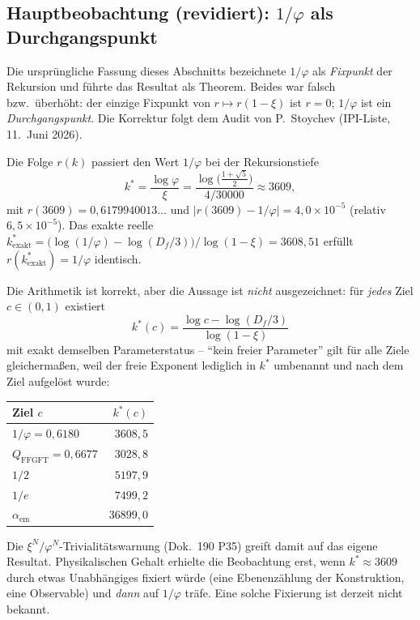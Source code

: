 \subsection{Hauptbeobachtung (revidiert): $1/\varphi$ als Durchgangspunkt}\label{sec:durchgang275}

\begin{remark}
Die ursprüngliche Fassung dieses Abschnitts bezeichnete $1/\varphi$ als
\emph{Fixpunkt} der Rekursion und führte das Resultat als Theorem. Beides
war falsch bzw.\ überhöht: der einzige Fixpunkt von $r\mapsto r(1-\xi)$
ist $r=0$; $1/\varphi$ ist ein \emph{Durchgangspunkt}. Die Korrektur
folgt dem Audit von P.~Stoychev (IPI-Liste, 11.~Juni 2026).
\end{remark}

\begin{beobachtung*}
Die Folge $r(k)$ passiert den Wert $1/\varphi$ bei der Rekursionstiefe
\begin{equation}
  k^* = \frac{\log\varphi}{\xi}
      = \frac{\log\!\bigl(\tfrac{1+\sqrt{5}}{2}\bigr)}{4/30000}
      \approx 3609,
  \label{eq:kstar275}
\end{equation}
mit $r(3609) = 0{,}6179940013\ldots$ und
$|r(3609)-1/\varphi| = 4{,}0\times10^{-5}$
(relativ $6{,}5\times10^{-5}$). Das exakte reelle
$k^*_\mathrm{exakt} = \bigl(\log(1/\varphi)-\log(D_f/3)\bigr)/\log(1-\xi)
= 3608{,}51$ erfüllt $r(k^*_\mathrm{exakt}) = 1/\varphi$ identisch.
\end{beobachtung*}

\begin{remark}
Die Arithmetik ist korrekt, aber die Aussage ist \emph{nicht}
ausgezeichnet: für \emph{jedes} Ziel $c\in(0,1)$ existiert
\begin{equation}
  k^*(c) = \frac{\log c - \log(D_f/3)}{\log(1-\xi)}
\end{equation}
mit exakt demselben Parameterstatus -- \enquote{kein freier Parameter}
gilt für alle Ziele gleichermaßen, weil der freie Exponent lediglich in
$k^*$ umbenannt und nach dem Ziel aufgelöst wurde:
\begin{center}
\begin{tabular}{@{}lr@{}}
\toprule
Ziel $c$ & $k^*(c)$ \\
\midrule
$1/\varphi = 0{,}6180$        & $3608{,}5$ \\
$Q_\mathrm{FFGFT} = 0{,}6677$ & $3028{,}8$ \\
$1/2$                          & $5197{,}9$ \\
$1/e$                          & $7499{,}2$ \\
$\alpha_\mathrm{em}$          & $36899{,}0$ \\
\bottomrule
\end{tabular}
\end{center}
Die $\xi^N/\varphi^N$-Trivialitätswarnung (Dok.~190 P35) greift damit
auf das eigene Resultat. Physikalischen Gehalt erhielte die Beobachtung
erst, wenn $k^*\approx 3609$ durch etwas Unabhängiges fixiert würde
(eine Ebenenzählung der Konstruktion, eine Observable) und \emph{dann}
auf $1/\varphi$ träfe. Eine solche Fixierung ist derzeit nicht bekannt.
\end{remark}

